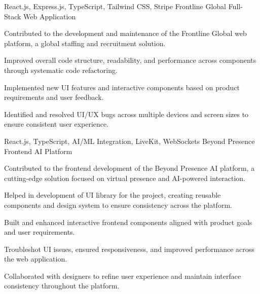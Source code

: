 \newpage
{}


\begin{cventries}

  \cventry
    {React.js, Express.js, TypeScript, Tailwind CSS, Stripe} %
    {Frontline Global} %
    {Full-Stack Web Application}
    {}
    {
      \begin{cvitems} %
        \item {Contributed to the development and maintenance of the Frontline Global web platform, a global staffing and recruitment solution.}
        \item {Improved overall code structure, readability, and performance across components through systematic code refactoring.}
        \item {Implemented new UI features and interactive components based on product requirements and user feedback.}
        \item {Identified and resolved UI/UX bugs across multiple devices and screen sizes to ensure consistent user experience.}
      \end{cvitems}
    }

  \cventry
    {React.js, TypeScript, AI/ML Integration, LiveKit, WebSockets} %
    {Beyond Presence} %
    {Frontend AI Platform} %
    {}
    {
      \begin{cvitems} %
        \item {Contributed to the frontend development of the Beyond Presence AI platform, a cutting-edge solution focused on virtual presence and AI-powered interaction.}
        \item {Helped in development of UI library for the project, creating reusable components and design system to ensure consistency across the platform.}
        \item {Built and enhanced interactive frontend components aligned with product goals and user requirements.}
        \item {Troubleshot UI issues, ensured responsiveness, and improved performance across the web application.}
        \item {Collaborated with designers to refine user experience and maintain interface consistency throughout the platform.}
      \end{cvitems}
    }



\end{cventries}

